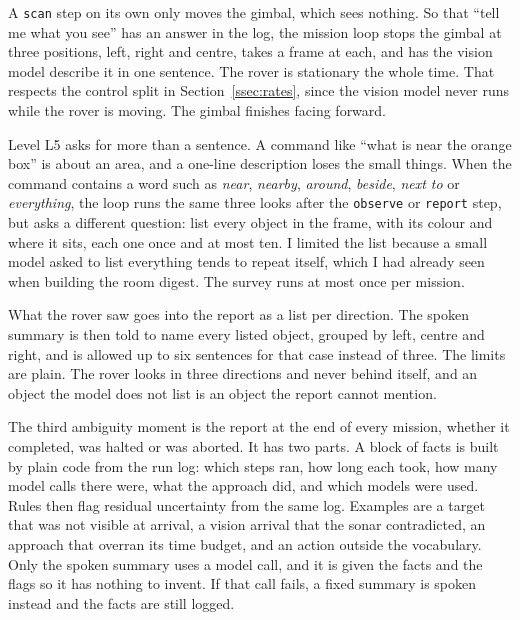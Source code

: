 A \texttt{scan} step on its own only moves the gimbal, which sees nothing. So
that ``tell me what you see'' has an answer in the log, the mission loop stops the
gimbal at three positions, left, right and centre, takes a frame at each, and has
the vision model describe it in one sentence. The rover is stationary the whole
time. That respects the control split in Section~\ref{ssec:rates}, since the
vision model never runs while the rover is moving. The gimbal finishes facing
forward.

Level L5 asks for more than a sentence. A command like ``what is near the orange
box'' is about an area, and a one-line description loses the small things. When
the command contains a word such as \emph{near}, \emph{nearby}, \emph{around},
\emph{beside}, \emph{next to} or \emph{everything}, the loop runs the same three
looks after the \texttt{observe} or \texttt{report} step, but asks a different
question: list every object in the frame, with its colour and where it sits,
each one once and at most ten. I limited the list because a small model asked to
list everything tends to repeat itself, which I had already seen when building
the room digest. The survey runs at most once per mission.

What the rover saw goes into the report as a list per direction. The spoken
summary is then told to name every listed object, grouped by left, centre and
right, and is allowed up to six sentences for that case instead of three. The
limits are plain. The rover looks in three directions and never behind itself,
and an object the model does not list is an object the report cannot mention.

\label{ssec:line_follower}
%

\label{sec:report}

The third ambiguity moment is the report at the end of every mission, whether it
completed, was halted or was aborted. It has two parts. A block of facts is built
by plain code from the run log: which steps ran, how long each took, how many
model calls there were, what the approach did, and which models were used. Rules
then flag residual uncertainty from the same log. Examples are a target that was
not visible at arrival, a vision arrival that the sonar contradicted, an approach
that overran its time budget, and an action outside the vocabulary. Only the
spoken summary uses a model call, and it is given the facts and the flags so it
has nothing to invent. If that call fails, a fixed summary is spoken instead and
the facts are still logged.

